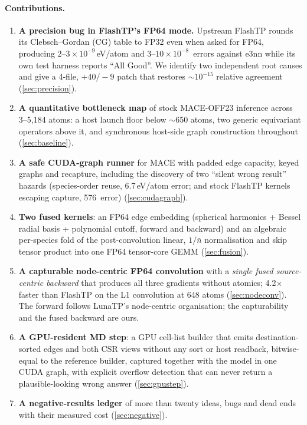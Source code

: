 \paragraph{Contributions.}
\begin{enumerate}
  \item \textbf{A precision bug in FlashTP's FP64 mode.} Upstream FlashTP rounds its Clebsch--Gordan (CG) table to FP32 even when asked for FP64, producing $2$--$3\times10^{-9}$\,eV/atom and $3$--$10\times10^{-8}$\,\eVA{} errors against e3nn while its own test harness reports ``All Good''. We identify two independent root causes and give a 4-file, $+40/-9$ patch that restores $\sim10^{-15}$ relative agreement (\cref{sec:precision}).
  \item \textbf{A quantitative bottleneck map} of stock MACE-OFF23 inference across 3--5{,}184 atoms: a host launch floor below $\sim$650 atoms, two generic equivariant operators above it, and synchronous host-side graph construction throughout (\cref{sec:baseline}).
  \item \textbf{A safe CUDA-graph runner} for MACE with padded edge capacity, keyed graphs and recapture, including the discovery of two ``silent wrong result'' hazards (species-order reuse, 6.7\,eV/atom error; and stock FlashTP kernels escaping capture, 576\,\eVA{} error) (\cref{sec:cudagraph}).
  \item \textbf{Two fused kernels}: an FP64 edge embedding (spherical harmonics + Bessel radial basis + polynomial cutoff, forward and backward) and an algebraic per-species fold of the post-convolution linear, $1/\bar n$ normalisation and skip tensor product into one FP64 tensor-core GEMM (\cref{sec:fusion}).
  \item \textbf{A capturable node-centric FP64 convolution} with a \emph{single fused source-centric backward} that produces all three gradients without atomics; 4.2$\times$ faster than FlashTP on the L1 convolution at 648 atoms (\cref{sec:nodeconv}). The forward follows LunaTP's node-centric organisation; the capturability and the fused backward are ours.
  \item \textbf{A GPU-resident MD step}: a GPU cell-list builder that emits destination-sorted edges and both CSR views without any sort or host readback, bitwise-equal to the reference builder, captured together with the model in one CUDA graph, with explicit overflow detection that can never return a plausible-looking wrong answer (\cref{sec:gpustep}).
  \item \textbf{A negative-results ledger} of more than twenty ideas, bugs and dead ends with their measured cost (\cref{sec:negative}).
\end{enumerate}

